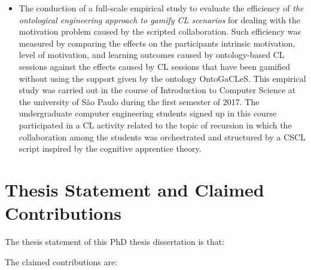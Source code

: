 \begin{description}
\begin{itemize}
\item
The conduction of a full-scale empirical study to evaluate the efficiency of \emph{the ontological engineering approach to gamify CL scenarios} for dealing with the motivation problem caused by the scripted collaboration. Such efficiency was measured by comparing the effects on the participants intrinsic motivation, level of motivation, and learning outcomes caused by ontology-based CL sessions against the effects caused by CL sessions that have been gamified without using the support given by the ontology OntoGaCLeS. This empirical study was carried out in the course of Introduction to Computer Science at the university of São Paulo during the first semester of 2017. The undergraduate computer engineering students signed up in this course participated in a CL activity related to the topic of recursion in which the collaboration among the students was orchestrated and structured by a CSCL script inspired by the cognitive apprentice theory.
\end{itemize}
\end{description}

\section{Thesis Statement and Claimed Contributions}
\label{sec:thesis-statement-and-claimed-contributions}

The thesis statement of this PhD thesis dissertation is that:


The claimed contributions are:

